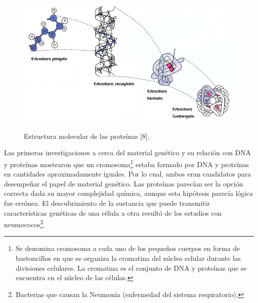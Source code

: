 \begin{itemize}
    \begin{figure} [h]
	    \begin{center}
		    \includegraphics[width=5.7209in,height=2.7000in]{image/estructuraProteina.png}
		    \caption{Estructura molecular de las proteínas [8].}
		    \label{proteina}
	    \end{center}
    \end{figure}	
\end{itemize}

Las primeras investigaciones a cerca del material genético y su relación con DNA y proteínas mostraron que un cromosoma\footnote{Se denomina cromosoma a cada uno de los pequeños cuerpos en forma de bastoncillos en que se organiza la cromatina del núcleo celular durante las divisiones celulares. La cromatina es el conjunto de DNA y proteínas que se encuentra en el núcleo de las células.} estaba formado por DNA y proteínas en cantidades aproximadamente iguales. Por lo cual, ambos eran candidatos para desempeñar el papel de material genético. Las proteínas parecían ser la opción correcta dada su mayor complejidad química, aunque esta hipótesis parecía lógica fue errónea. 
El descubrimiento de la sustancia que puede transmitir características genéticas de una célula a otra resultó de los estudios con neumococos\footnote{Bacterias que causan la Neumonía (enfermedad del sistema respiratorio).}\cite{curtis}.

